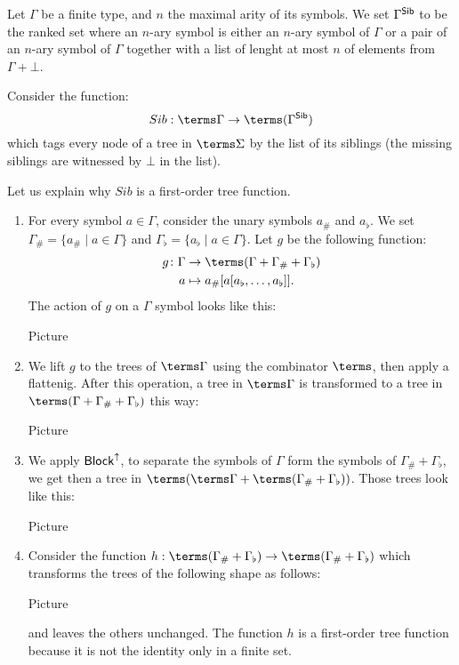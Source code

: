 \bigskip
\noindent \begin{example}
Let $\Gamma$ be a finite type, and $n$ the maximal arity of its symbols. We set $\Gamma^{\sf{Sib}}$ to be the ranked set where an $n$-ary symbol is either an $n$-ary symbol of $\Gamma$ or a pair of an $n$-ary symbol of $\Gamma$ together with a list of lenght at most $n$ of elements from $\Gamma+\bot$. %

\medskip
Consider the function:
\[ Sib: \terms \Gamma \to \terms (\Gamma^{\mathsf{Sib}})\]
which tags every node of a tree in $\terms \Sigma$ by the list of its siblings (the missing siblings are witnessed by $\bot$ in the list).

Let us explain why $Sib$ is a first-order tree function. 
\begin{enumerate}
\item For every symbol $a\in \Gamma$, consider the unary symbols $a_\#$ and $a_\flat$.
We set $\Gamma_\#=\{a_\#\mid a\in\Gamma\}$ and $\Gamma_\flat=\{a_\flat\mid a\in\Gamma\}$.
Let $g$ be the following function:
 \begin{align*}
  g\colon \Gamma &\to \terms(\Gamma+\Gamma_\#+\Gamma_\flat)\\
  a &\mapsto a_\#[a[a_\flat,\dots,a_\flat]].
\end{align*}
The action of $g$ on a $\Gamma$ symbol looks like this:
\begin{center}
Picture
\end{center}
\item We lift $g$ to the trees of $\terms \Gamma$ using the combinator $\terms$, then apply a flattenig. After this operation, a tree in $\terms\Gamma$ is transformed to a tree in $\terms(\Gamma+\Gamma_\#+\Gamma_\flat)$ this way:
\begin{center}
Picture
\end{center}
\item We apply $\sf{Block}^{\uparrow}$, to separate the symbols of $\Gamma$ form the symbols of $\Gamma_\#+\Gamma_\flat$, we get then a tree in $\terms(\terms\Gamma+\terms(\Gamma_\#+\Gamma_\flat))$. Those trees look like this:
\begin{center}
Picture
\end{center}
\item Consider the function $h:\terms(\Gamma_\#+\Gamma_\flat)\to \terms(\Gamma_\#+\Gamma_\flat)$ which transforms the trees of the following shape as follows:
\begin{center}
Picture
\end{center}
and leaves the others unchanged. 
The function $h$ is a first-order tree function because it is not the identity only in a finite set.


\end{enumerate}
\end{example}
